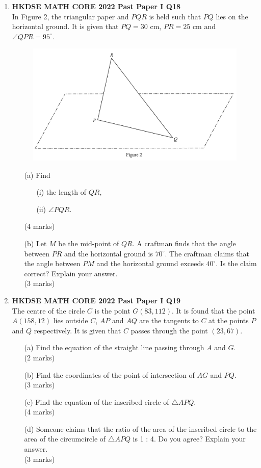 \documentclass[12pt]{article}
\begin{document}
\begin{enumerate}
	\item \textbf{HKDSE MATH CORE 2022 Past Paper I Q18}\\
	In Figure 2, the triangular paper and $PQR$ is held such that $PQ$ lies on the horizontal ground. It is given that $PQ = 30$ cm, $PR = 25$ cm and $\angle QPR = 95
	^\circ$.
	\begin{figure}[H]
		\centering
		\includegraphics[width = .3\linewidth]{2022Figure1.2}
	\end{figure}
	\begin{enumerate}
		\item[(a)] Find
		\begin{enumerate}
			\item[(i)] the length of $QR$,
			\item[(ii)] $\angle PQR$.
		\end{enumerate}
		(4 marks)
		\item[(b)] Let $M$ be the mid-point of $QR$. A craftman finds that the angle between $PR$ and the horizontal ground is $70^\circ$. The craftman claims that the angle between $PM$ and the horizontal ground exceeds $40^\circ$. Is the claim correct? Explain your answer. \\(3 marks)
	\end{enumerate}

	\item \textbf{HKDSE MATH CORE 2022 Past Paper I Q19}\\
	The centre of the circle $C$ is the point $G(83, 112)$. It is found that the point $A(158, 12)$ lies outside $C$, $AP$ and $AQ$ are the tangents to $C$ at the points $P$ and $Q$ respectively. It is given that $C$ passes through the point $(23, 67)$.
	\begin{enumerate}
		\item[(a)] Find the equation of the straight line passing through $A$ and $G$. \\(2 marks)
		\item[(b)] Find the coordinates of the point of intersection of $AG$ and $PQ$. \\(3 marks)
		\item[(c)] Find the equation of the inscribed circle of $\triangle APQ$. \\(4 marks)
		\item[(d)] Someone claims that the ratio of the area of the inscribed circle to the area of the circumcircle of $\triangle APQ$ is 1 : 4. Do you agree? Explain your answer. \\(3 marks)
	\end{enumerate}


\end{enumerate}
\end{document}
